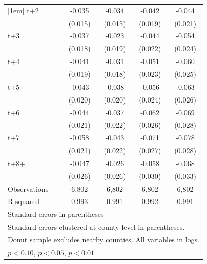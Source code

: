 \begin{table}[htbp]
\begin{tabular}{l*{4}{c}}
[1em]
t+2         &      -0.035\sym{**} &      -0.034\sym{**} &      -0.042\sym{**} &      -0.044\sym{**} \\
            &     (0.015)         &     (0.015)         &     (0.019)         &     (0.021)         \\
[1em]
t+3         &      -0.037\sym{**} &      -0.023         &      -0.044\sym{**} &      -0.054\sym{**} \\
            &     (0.018)         &     (0.019)         &     (0.022)         &     (0.024)         \\
[1em]
t+4         &      -0.041\sym{**} &      -0.031\sym{*}  &      -0.051\sym{**} &      -0.060\sym{**} \\
            &     (0.019)         &     (0.018)         &     (0.023)         &     (0.025)         \\
[1em]
t+5         &      -0.043\sym{**} &      -0.038\sym{*}  &      -0.056\sym{**} &      -0.063\sym{**} \\
            &     (0.020)         &     (0.020)         &     (0.024)         &     (0.026)         \\
[1em]
t+6         &      -0.044\sym{**} &      -0.037\sym{*}  &      -0.062\sym{**} &      -0.069\sym{**} \\
            &     (0.021)         &     (0.022)         &     (0.026)         &     (0.028)         \\
[1em]
t+7         &      -0.058\sym{***}&      -0.043\sym{**} &      -0.071\sym{***}&      -0.078\sym{***}\\
            &     (0.021)         &     (0.022)         &     (0.027)         &     (0.028)         \\
[1em]
t+8+        &      -0.047\sym{*}  &      -0.026         &      -0.058\sym{*}  &      -0.068\sym{**} \\
            &     (0.026)         &     (0.026)         &     (0.030)         &     (0.033)         \\
\hline
Observations&       6,802         &       6,802         &       6,802         &       6,802         \\
R-squared   &       0.993         &       0.991         &       0.992         &       0.991         \\
\hline\hline
\multicolumn{5}{l}{\footnotesize Standard errors in parentheses}\\
\multicolumn{5}{l}{\footnotesize Standard errors clustered at county level in parentheses.}\\
\multicolumn{5}{l}{\footnotesize Donut sample excludes nearby counties. All variables in logs.}\\
\multicolumn{5}{l}{\footnotesize \sym{*} \(p<0.10\), \sym{**} \(p<0.05\), \sym{***} \(p<0.01\)}\\
\end{tabular}
\end{table}
